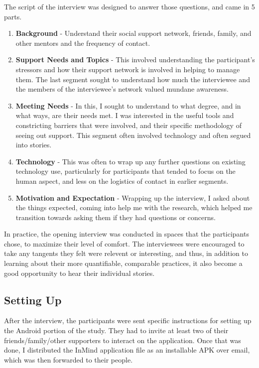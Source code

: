   The script of the interview was designed to answer those questions,
  and came in 5 parts.

  \begin{enumerate}
  \item \textbf{Background} -
    Understand their social support network,
    friends, family, and other mentors and the frequency of contact.
  \item \textbf{Support Needs and Topics} -
    This involved understanding the participant's stressors and how their
    support network is involved in helping to manage them.
    The last segment sought to understand how much the interviewee
    and the members of the interviewee's network valued
    mundane awareness.
  \item \textbf{Meeting Needs} -
    In this, I sought to understand to what degree,
    and in what ways, are their needs met.
    I was interested in the useful tools and constricting barriers
    that were involved,
    and their specific methodology of seeing out support.
    This segment often involved technology and often segued into stories.
  \item \textbf{Technology} -
    This was often to wrap up any further questions on existing technology use,
    particularly for participants that tended to focus on the human aspect,
    and less on the logistics of contact in earlier segments.
  \item \textbf{Motivation and Expectation} - 
    Wrapping up the interview, I asked about the things expected,
    coming into help me with the research,
    which helped me transition towards asking them if they had questions
    or concerns.
  \end{enumerate}

  In practice, the opening interview was conducted in spaces
  that the participants chose, to maximize their level of comfort.
  The interviewees were encouraged to take any tangents they felt
  were relevent or interesting, and thus,
  in addition to learning about their more quantifiable, comparable practices,
  it also become a good opportunity to hear their individual stories.

  \subsection{Setting Up}
  After the interview, the participants were sent specific instructions
  for setting up the Android portion of the study.
  They had to invite at least two of their friends/family/other supporters
  to interact on the application.
  Once that was done, I distributed the InMind application file as
  an installable APK over email, which was then forwarded to their people.

